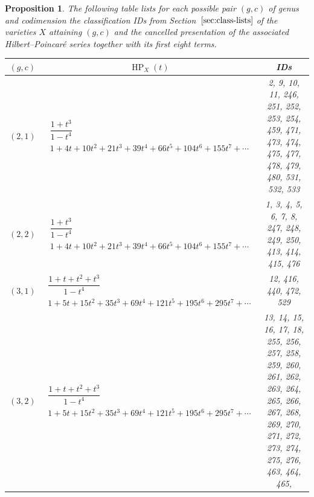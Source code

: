 \documentclass[10pt,a4paper]{amsart}
\newtheorem{prop}[thm]{Proposition}
\theoremstyle{definition}
\DeclareMathOperator\HP{HP}
\numberwithin{equation}{section}
\begin{document}
\begin{prop}
The following table lists for each possible pair $(g,c)$
of genus and codimension the classification IDs
from Section~$\ref{sec:class-lists}$ of the varieties
$X$ attaining $(g,c)$ and the cancelled presentation
of the associated Hilbert--Poincar\'{e}
series together with its first eight terms.
\begin{table}[h!]\centering\setlength{\tabcolsep}{4.5pt}
\renewcommand{\arraystretch}{1.4}\small\tabulinesep=1mm
\begin{tabu}{c|c|c}\hline
 $(g,c)$ & $\HP_X(t)$ & {\rm IDs}
 \\
 \hline
$(2,1)$\label{T(1,2)}
&$\begin{array}{c}
 \dfrac{1+t^3}{1-t^4} \\[10pt]
 {1+4t+10t^2+21t^3+39t^4+66t^5+104t^6+155t^7+\cdots}
\end{array}$
& \begin{minipage}{4cm} \rm
 2, 9, 10, 11, 246, 251, 252, 253, 254, 459,
 471, 473, 474, 475, 477, 478, 479, 480, 531, 532, 533
 \end{minipage}
\\
\hline
$(2,2)$\label{T(2,2)}
&$\begin{array}{c}
\dfrac{1+t^3}{1-t^4} \\[10pt]
{1+4t+10t^2+21t^3+39t^4+66t^5+104t^6+155t^7+\cdots}
\end{array}$
& \begin{minipage}{4cm} \rm
 1, 3, 4, 5, 6, 7, 8, 247, 248, 249,
 250, 413, 414, 415, 476
 \end{minipage}
\\
\hline
$(3,1)$\label{T(1,3)}
&$\begin{array}{c}
\dfrac{1+t+t^2+t^3}{1-t^4} \\[10pt]
{1+5t+15t^2+35t^3+69t^4+121t^5+195t^6+295t^7+\cdots}
\end{array}$
&\begin{minipage}{4cm} \rm
 12, 416, 440, 472, 529
 \end{minipage}
\\
\hline
$(3,2)$\label{T(2,3)}
&$\begin{array}{c}
 \dfrac{1+t+t^2+t^3}{1-t^4} \\[15pt]
{1+5t+15t^2+35t^3+69t^4+121t^5+195t^6+295t^7+\cdots}
\end{array}$
& \begin{minipage}{4cm} \rm
 13, 14, 15, 16, 17, 18, 255, 256, 257, 258, 259,
 260, 261, 262, 263, 264, 265, 266, 267, 268, 269,
 270, 271, 272, 273, 274, 275, 276, 463, 464, 465,

\end{minipage}
\end{tabu}
\end{table}
\end{prop}
\end{document}
